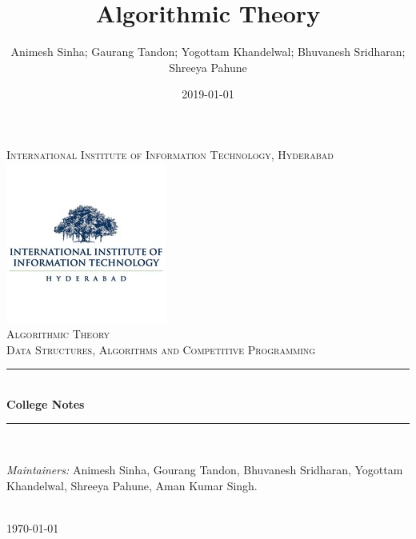 \documentclass{book}
\title{Algorithmic Theory}
\date{2019-01-01}
\author{Animesh Sinha; Gaurang Tandon; Yogottam Khandelwal; Bhuvanesh Sridharan; Shreeya Pahune}
\newcounter{theo}[section]\setcounter{theo}{0}
\begin{document}


\begin{titlepage}
    \newcommand{\HRule}{\rule{\linewidth}{0.5mm}}
    \center
    \textsc{\LARGE International Institute of Information Technology, Hyderabad}\\[0.5cm]
    \includegraphics[scale=1]{img/iiit-logo.jpeg}\\[0.5cm]
    \textsc{\Large Algorithmic Theory}\\[0.5cm]
    \textsc{\large Data Structures, Algorithms and Competitive Programming}\\[0.5cm] %
    \HRule \\[0.4cm]
    { \huge \bfseries College Notes}\\[0.4cm]
    \HRule \\[1.5cm]
    \begin{minipage}{0.6\textwidth}
    \begin{flushleft} \large
    \emph{Maintainers:} Animesh Sinha, Gourang Tandon, Bhuvanesh Sridharan, Yogottam Khandelwal, Shreeya Pahune, Aman Kumar Singh.
    \end{flushleft}
    \end{minipage}\\[2cm]
    {\large \today}\\[2cm]
    \vfill
\end{titlepage}






\end{document}
